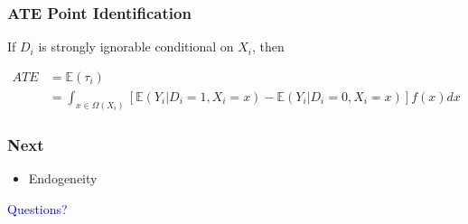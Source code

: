 \documentclass{beamer}
\begin{document}
\begin{frame}
	\frametitle{ATE Point Identification}
	\begin{theorem}
		If $D_i$ is strongly ignorable conditional on $X_i$, then 
		
		\begin{align*}
			ATE &= \mathbb E(\tau_i) \\
			&= \int_{x \in \Omega(X_i)} \left[\mathbb E(Y_i | D_i=1, X_i=x) - \mathbb E(Y_i | D_i=0, X_i=x)\right] f(x) dx
		\end{align*}
	\end{theorem}
\end{frame}


\begin{frame}
	\frametitle{Next}
	\begin{itemize}
		\item Endogeneity
	\end{itemize}
\begin{center}
	\Large\textcolor{blue}{Questions?}
\end{center}
\end{frame}
\end{document}
